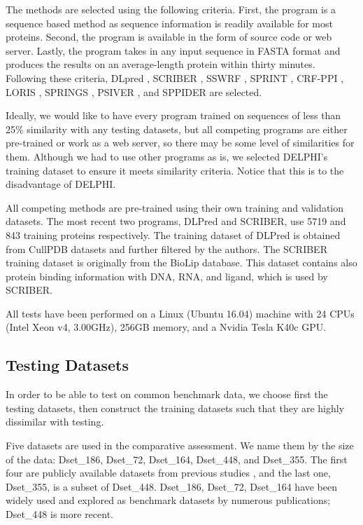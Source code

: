 The methods are selected using the following criteria. First, the program is a sequence based method as sequence information is readily available for most proteins. Second, the program is available in the form of source code or web server. Lastly, the program takes in any input sequence in FASTA format and produces the results on an average-length protein within thirty minutes. Following these criteria, DLpred \cite{zhang2019sequence}, SCRIBER \cite{zhang2019scriber}, SSWRF \cite{wei2016protein}, SPRINT \cite{taherzadeh2016sequence}, CRF-PPI \cite{wei2015cascade}, LORIS \cite{dhole2014sequence}, SPRINGS \cite{singh2014springs}, PSIVER \cite{murakami2010applying}, and SPPIDER \cite{porollo2007prediction} are selected.

Ideally, we would like to have every program trained on sequences of less than 25\% similarity with any testing datasets, but all competing programs are either pre-trained or work as a web server, so there may be some level of similarities for them. Although we had to use other programs as is, we selected DELPHI's training dataset to ensure it meets similarity criteria. Notice that this is to the disadvantage of DELPHI.

All competing methods are pre-trained using their own training and validation datasets. The most recent two programs, DLPred and SCRIBER, use 5719 and 843 training proteins respectively. The training dataset of DLPred is obtained from CullPDB datasets \cite{wang2003pisces} and further filtered by the authors. The SCRIBER training dataset is originally from the BioLip database. This dataset contains also protein binding information with DNA, RNA, and ligand, which is used by SCRIBER.

All tests have been performed on a Linux (Ubuntu 16.04) machine with 24 CPUs (Intel Xeon v4, 3.00GHz), 256GB memory, and a Nvidia Tesla K40c GPU.
\subsection{Testing Datasets \label{testing_data}}
In order to be able to test on common benchmark data, we choose first the testing datasets, then construct the training datasets such that they are highly dissimilar with testing.

Five datasets are used in the comparative assessment. We name them by the size of the data: Dset\_186, Dset\_72, Dset\_164, Dset\_448, and Dset\_355. The first four are publicly available datasets from previous studies \cite{murakami2010applying} \cite{dhole2014sequence} \cite{zhang2019scriber}, and the last one, Dset\_355, is a subset of Dset\_448. Dset\_186, Dset\_72, Dset\_164 have been widely used and explored as benchmark datasets by numerous publications; Dset\_448 is more recent.

